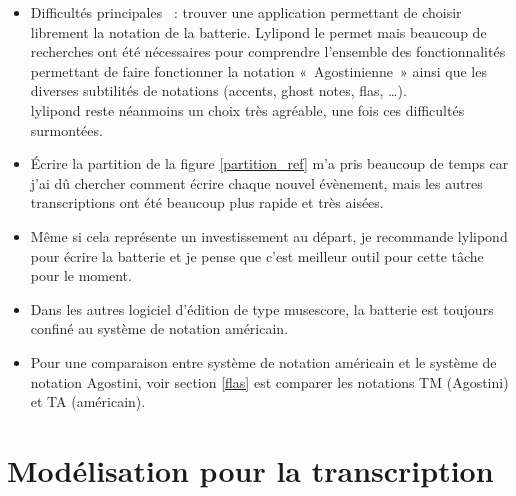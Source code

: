 \begin{itemize}
    \item Difficultés principales~ : trouver une application permettant de
        choisir librement la notation de la batterie. Lylipond le permet mais
        beaucoup de recherches ont été nécessaires pour comprendre l’ensemble
        des fonctionnalités permettant de faire fonctionner la notation
        «~Agostinienne~» ainsi que les diverses subtilités de notations
        (accents, ghost notes, flas, …).\\
        lylipond reste néanmoins un choix très agréable, une fois ces
        difficultés surmontées.
    \item Écrire la partition de la figure \ref{partition_ref} m’a pris
        beaucoup de temps car j’ai dû chercher comment écrire chaque nouvel
        évènement, mais les autres transcriptions ont été beaucoup plus rapide
        et très aisées.
    \item Même si cela représente un investissement au départ, je recommande
        lylipond pour écrire la batterie et je pense que c’est meilleur outil
        pour cette tâche pour le moment.
    \item Dans les autres logiciel d’édition de type musescore, la batterie
        est toujours confiné au système de notation américain.
    \item Pour une comparaison entre système de notation américain et le système de notation Agostini,
        voir section \ref{flas} est comparer les notations TM (Agostini) et
        TA (américain).
\end{itemize}


\section{Modélisation pour la transcription}
\label{modelisation_transcription}
